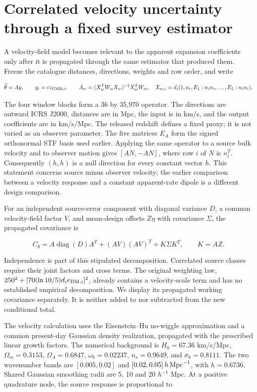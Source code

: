 \section{Correlated velocity uncertainty through a fixed survey estimator}
A velocity-field model becomes relevant to the apparent expansion
coefficients only after it is propagated through the same estimator that
produced them. Freeze the catalogue distances, directions, weights and
row order, and write

\[
 \widehat\theta=A y,\qquad y_i=c z_{{\rm CMB},i},\qquad
 A_w=(X_w^T W_wX_w)^{-1}X_w^T W_w,
 \quad X_{w,i}=d_i(1,n_i,E_1:n_in_i,\ldots,E_5:n_in_i).
\]

The four window blocks form a 36 by 35,970 operator. The directions are
outward ICRS J2000, distances are in Mpc, the input is in km/s, and the
output coefficients are in km/s/Mpc. The released redshift defines a
fixed proxy; it is not varied as an observer parameter. The five
matrices \(E_A\) form the signed orthonormal STF basis used earlier.
Applying the same operator to a source bulk velocity and to observer
motion gives \([AN,-AN]\), where row \(i\) of \(N\) is \(n_i^T\).
Consequently \((h,h)\) is a null direction for every constant vector
\(h\). This statement concerns source minus observer velocity; the
earlier comparison between a velocity response and a constant
apparent-rate dipole is a different design comparison.

For an independent source-error component with diagonal variance \(D\),
a common velocity-field factor \(V\), and mean-design offsets \(Z\eta\)
with covariance \(\Sigma\), the propagated covariance is

\[
 C_\theta=A\operatorname{diag}(D)A^T+(AV)(AV)^T+K\Sigma K^T,
 \qquad K=AZ.
\]

Independence is part of this stipulated decomposition. Correlated source
classes require their joint factors and cross terms. The original
weighting law, \(250^2+[70(\ln10/5)d_i e_{{\rm DM},i}]^2\), already
contains a velocity-scale term and has no established empirical
decomposition. We display its propagated working covariance separately.
It is neither added to nor subtracted from the new conditional total.

The velocity calculation uses the Eisenstein--Hu no-wiggle approximation
and a common present-day Gaussian density realization, propagated with
the prescribed linear growth factors. The numerical background is
\(H_0=67.36\) km/s/Mpc, \(\Omega_m=0.3153\), \(\Omega_\Lambda=0.6847\),
\(\omega_b=0.02237\), \(n_s=0.9649\), and \(\sigma_8=0.8111\). The two
wavenumber bands are \([0.005,0.02]\) and
\([0.02,0.05]\,h\,{\rm Mpc}^{-1}\), with \(h=0.6736\). Shared Gaussian
smoothing radii are 5, 10 and 20 \(h^{-1}\) Mpc. At a positive
quadrature node, the source response is proportional to

